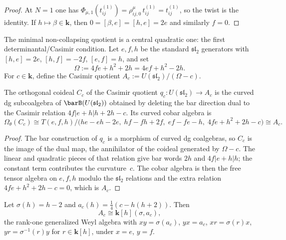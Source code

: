 \begin{proof}
At $N = 1$ one has
$\Phi_{\mu,1}(t_{ij}^{(1)}) = \rho_{ij,0}^\mu\,t_{ij}^{(1)}
= t_{ij}^{(1)}$,
so the twist is the identity. If $h \mapsto \beta \in \mathbf{k}$,
then $0 = [\beta, e] = [h,e] = 2e$ and similarly $f = 0$.
\end{proof}

The minimal non-collapsing quotient is a central quadratic one: the
first determinantal/Casimir condition. Let $e, f, h$ be the standard
$\mathfrak{sl}_2$ generators with $[h,e] = 2e$, $[h,f] = -2f$,
$[e,f] = h$, and set
\[
\Omega := 4fe + h^2 + 2h = 4ef + h^2 - 2h.
\]
For $c \in \mathbf{k}$, define the Casimir quotient
$A_c := U(\mathfrak{sl}_2)/(\Omega - c)$.

\begin{theorem}
\label{thm:shifted-rtt-rank-one-coideal}
The orthogonal coideal $C_c$ of the Casimir quotient
$q_c \colon U(\mathfrak{sl}_2) \to A_c$ is the curved dg
subcoalgebra of $\barB(U(\mathfrak{sl}_2))$ obtained by deleting
the bar direction dual to the Casimir relation
$4f|e + h|h + 2h - c$. Its curved cobar algebra is
\[
\Omega_\theta(C_c)
\cong T(e,f,h)\Big/\!\bigl(he - eh - 2e,\;
hf - fh + 2f,\; ef - fe - h,\; 4fe + h^2 + 2h - c\bigr)
\cong A_c.
\]
\end{theorem}

\begin{proof}
The bar construction of $q_c$ is a morphism of curved dg
coalgebras, so $C_c$ is the image of the dual map, the
annihilator of the coideal generated by $\Omega - c$. The
linear and quadratic pieces of that relation give bar words
$2h$ and $4f|e + h|h$; the constant term contributes the
curvature~$c$. The cobar algebra is then the free tensor
algebra on $e,f,h$ modulo the $\mathfrak{sl}_2$ relations and the
extra relation $4fe + h^2 + 2h - c = 0$, which is $A_c$.
\end{proof}

\begin{corollary}
\label{cor:shifted-rtt-weyl-algebra}
Let $\sigma(h) = h - 2$ and
$a_c(h) = \tfrac{1}{4}(c - h(h+2))$. Then
\[
A_c \cong \mathbf{k}[h](\sigma, a_c),
\]
the rank-one generalized Weyl algebra with
$xy = \sigma(a_c)$, $yx = a_c$,
$xr = \sigma(r)x$, $yr = \sigma^{-1}(r)y$
for $r \in \mathbf{k}[h]$, under $x = e$, $y = f$.
\end{corollary}

